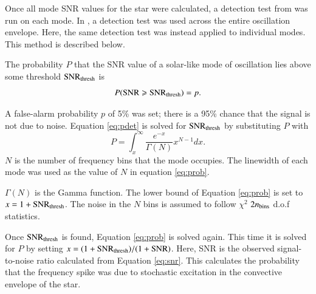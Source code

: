 \documentclass[a4paper,fleqn,usenatbib,useAMS]{mnras}
\begin{document}
Once all mode SNR values for the star were calculated, a detection test from \citet{chaplin_predicting_2011} was run on each mode. In \citet{chaplin_predicting_2011}, a detection test was used across the entire oscillation envelope. Here, the same detection test was instead applied to individual modes. This method is described below.

The probability $P$ that the SNR value of a solar-like mode of oscillation lies above some threshold ${\rm SNR_{thresh}}$ is
\begin{equation}
\label{eq:pdet}
{P \rm ({ SNR \geq SNR_{thresh}})} =  p .
\end{equation}

A false-alarm probability $p$ of 5\% was set; there is a 95\% chance that the signal is not due to noise. Equation \ref{eq:pdet} is solved for $\rm SNR_{thresh}$ by substituting $P$ with
\begin{equation}
\label{eq:prob}
P = \int_{x}^{\infty} \frac{e^{-x}}{\Gamma(N)} x^{N-1} dx .
\end{equation}
$N$ is the number of frequency bins that the mode occupies. The linewidth of each mode was used as the value of $N$ in equation \ref{eq:prob}.

$\Gamma(N)$ is the Gamma function. The lower bound of Equation \ref{eq:prob} is set to $x=1+{\rm SNR_{thresh}}$. The noise in the $N$ bins is assumed to follow $\chi^{2}$ $2n_{\rm bins}$ d.o.f statistics. 

Once $\rm SNR_{thresh}$ is found, Equation \ref{eq:prob} is solved again. This time it is solved for $P$ by setting $x=(1+{\rm SNR_{thresh}})/(1+{\rm SNR})$. Here, SNR is the observed signal-to-noise ratio calculated from Equation \ref{eq:snr}. This calculates the probability that the frequency spike was due to stochastic excitation in the convective envelope of the star.
\end{document}
